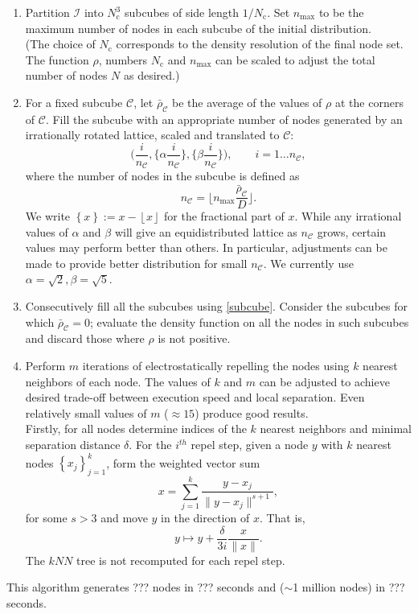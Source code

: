 \documentclass[10pt]{amsart}
\newcommand{\cube}{\mathcal{C}}
\begin{document}
\begin{enumerate}
	
	\item Partition $\mathcal{I}$ into $N_\text{c}^3$ subcubes of side length $1/N_\text{c}$. Set $n_\text{max}$ to be the maximum number of nodes in each subcube of the initial distribution. \\
	(The choice of $N_\text{c}$ corresponds to the  density resolution of the final node set. The function $ \rho $, numbers $N_\text{c}$  and $n_\text{max}$ can be scaled to adjust the total number of nodes $N$ as desired.) 
	
	\item \label{subcube}  For a fixed subcube $\cube$, let $\bar{\rho}_\cube$ be the average of the values of $\rho$ at the corners of $\cube$. Fill the subcube with an appropriate number of nodes generated by an irrationally rotated lattice,  scaled and translated to $\cube$:
	\[\bigg(\frac{i}{n_\cube}, \bigg\{\alpha\frac{i}{n_\cube}\bigg\}, \bigg\{\beta\frac{i}{n_\cube}\bigg\}\bigg), \qquad i=1\dots n_\cube, \]
	where the number of nodes in the subcube is defined as
	\[  n_\cube = \lfloor  n_\text{max}\frac{ \bar{\rho}_\cube }{D} \rfloor.  \] 
	We write $\left\{x\right\}:= x-\left\lfloor x\right\rfloor$ for the fractional part of $x$. While any irrational values of $\alpha$ and $\beta$ will give an equidistributed lattice as $n_\cube$ grows, certain values  may perform better than others. In particular, adjustments can be made to provide better distribution for small $n_\cube$. We currently use $\alpha = \sqrt{2}, \beta = \sqrt{5}$.
	
	\item Consecutively fill all the subcubes using \eqref{subcube}. Consider the subcubes for which $ \bar{\rho}_\cube =0 $; evaluate the density function on all the nodes in such subcubes and discard those where $ \rho $ is not positive.
	
	\item Perform $ m $ iterations of electrostatically repelling the nodes using $ k $ nearest neighbors of each node. The values of $ k $ and $ m $ can be adjusted to achieve desired trade-off between execution speed and local separation. Even relatively small values of $ m $ ($ \approx 15 $) produce good results. \\
	Firstly, for all nodes determine indices of the $ k $ nearest neighbors and minimal separation distance $ \delta $. 
	For the $i^{th}$ repel step, given a node $y$ with $ k $ nearest nodes $\left\{x_j\right\}_{j=1}^k$, form the weighted vector sum
	\[x = \sum_{j=1}^{k}\frac{y-x_j}{\|y-x_j\|^{s+1}}, \]
	for some $s>3$ and move $y$ in the direction of $x$. That is,
	\[y\mapsto y + \frac{\delta}{3i}\frac{x}{\|x\|}.\]
	The $kNN$ tree is not recomputed for each repel step.
\end{enumerate}
This algorithm generates ??? nodes in ??? seconds and ($ \sim $1 million nodes) in ??? seconds.
\end{document}

